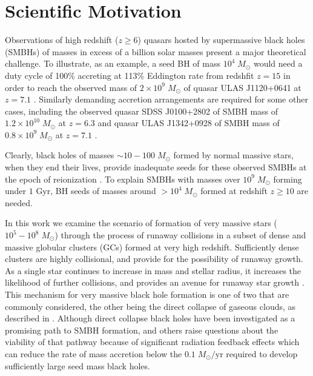 \documentclass[preprint1]{aastex}
\title{}
\author{Elias Rubin}
\newcommand\Msun{\; M_\odot}
\newcommand\msun{\; M_\odot}
\newcommand\Gyr{\mbox{ Gyr}}
\numberwithin{equation}{section}
\begin{document}

\section{Scientific Motivation} \label{Intro}


Observations of high redshift ($z \ge 6$) quasars hosted by supermassive black holes (SMBHs) 
of masses in excess of a billion solar masses 
present a major theoretical challenge.
To illustrate, as an example, 
a seed BH of mass $10^4\msun$ would need a duty cycle of 100\%
accreting at 113\% Eddington rate 
from redshfit $z=15$ in order to reach 
the observed mass of $2\times 10^9\msun$ 
of quasar ULAS J1120+0641 at $z=7.1$ \citep[][]{2011Mortlock}.
Similarly demanding accretion arrangements are required for some other
cases, including 
the observed quasar SDSS J0100+2802 of SMBH mass of $1.2\times 10^{10}\msun$ at $z=6.3$ \citep[][]{2015Wu}
and 
quasar ULAS J1342+0928 of SMBH mass of $0.8\times 10^{9}\msun$ at $z=7.1$ \citep[][]{2017Banados}.

Clearly, black holes of masses $\sim 10-100\msun$ formed by normal massive stars,
when they end their lives,
provide inadequate seeds for these observed SMBHs at the epoch of reionization \citep{2003Bromm, 2013Hosokawa}. 
To explain SMBHs with masses over $10^9 \Msun$ forming under $1 \Gyr$, 
BH seeds of masses around $>10^4\Msun$ formed at redshift $z\ge 10$ are needed.

In this work we examine the scenario of formation of very massive stars
($10^5-10^8\msun$) 
through the process of runaway collisions in 
a subset of dense and massive globular clusters (GCs) formed at very high redshift.
Sufficiently dense clusters are highly collisional, and provide for the possibility of runaway growth. 
As a single star continues to increase in mass and stellar radius, it increases the likelihood of further collisions, and provides an avenue for runaway star growth \citep{2015Katz}. 
This mechanism for very massive black hole formation is one of two that are commonly considered, 
the other being the direct collapse of gaseous clouds, as described in \citet{2003Bromm}.
Although direct collapse black holes have been investigated as a promising path to SMBH formation, 
\citet{2016Latif} and others raise questions about the viability of that pathway because of significant radiation feedback effects which can reduce the rate of mass accretion below the $0.1 \Msun/\mbox{yr}$ required to develop sufficiently large seed mass black holes.
\end{document}
